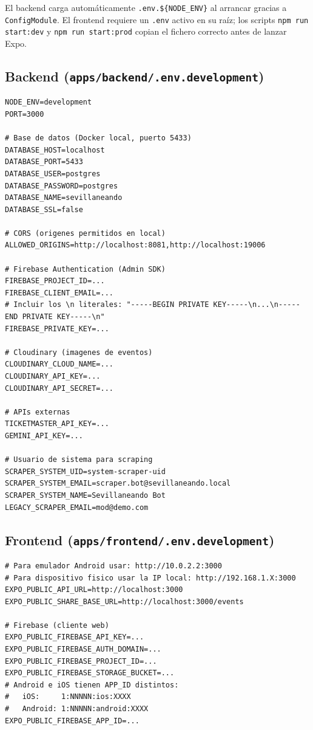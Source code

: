 El backend carga automáticamente \texttt{.env.\$\{NODE\_ENV\}} al arrancar gracias a \texttt{ConfigModule}. El frontend requiere un \texttt{.env} activo en su raíz; los scripts \texttt{npm run start:dev} y \texttt{npm run start:prod} copian el fichero correcto antes de lanzar Expo.

\subsection{Backend (\texttt{apps/backend/.env.development})}

\begin{lstlisting}
NODE_ENV=development
PORT=3000

# Base de datos (Docker local, puerto 5433)
DATABASE_HOST=localhost
DATABASE_PORT=5433
DATABASE_USER=postgres
DATABASE_PASSWORD=postgres
DATABASE_NAME=sevillaneando
DATABASE_SSL=false

# CORS (origenes permitidos en local)
ALLOWED_ORIGINS=http://localhost:8081,http://localhost:19006

# Firebase Authentication (Admin SDK)
FIREBASE_PROJECT_ID=...
FIREBASE_CLIENT_EMAIL=...
# Incluir los \n literales: "-----BEGIN PRIVATE KEY-----\n...\n-----END PRIVATE KEY-----\n"
FIREBASE_PRIVATE_KEY=...

# Cloudinary (imagenes de eventos)
CLOUDINARY_CLOUD_NAME=...
CLOUDINARY_API_KEY=...
CLOUDINARY_API_SECRET=...

# APIs externas
TICKETMASTER_API_KEY=...
GEMINI_API_KEY=...

# Usuario de sistema para scraping
SCRAPER_SYSTEM_UID=system-scraper-uid
SCRAPER_SYSTEM_EMAIL=scraper.bot@sevillaneando.local
SCRAPER_SYSTEM_NAME=Sevillaneando Bot
LEGACY_SCRAPER_EMAIL=mod@demo.com
\end{lstlisting}

\subsection{Frontend (\texttt{apps/frontend/.env.development})}

\begin{lstlisting}
# Para emulador Android usar: http://10.0.2.2:3000
# Para dispositivo fisico usar la IP local: http://192.168.1.X:3000
EXPO_PUBLIC_API_URL=http://localhost:3000
EXPO_PUBLIC_SHARE_BASE_URL=http://localhost:3000/events

# Firebase (cliente web)
EXPO_PUBLIC_FIREBASE_API_KEY=...
EXPO_PUBLIC_FIREBASE_AUTH_DOMAIN=...
EXPO_PUBLIC_FIREBASE_PROJECT_ID=...
EXPO_PUBLIC_FIREBASE_STORAGE_BUCKET=...
# Android e iOS tienen APP_ID distintos:
#   iOS:     1:NNNNN:ios:XXXX
#   Android: 1:NNNNN:android:XXXX
EXPO_PUBLIC_FIREBASE_APP_ID=...
\end{lstlisting}

